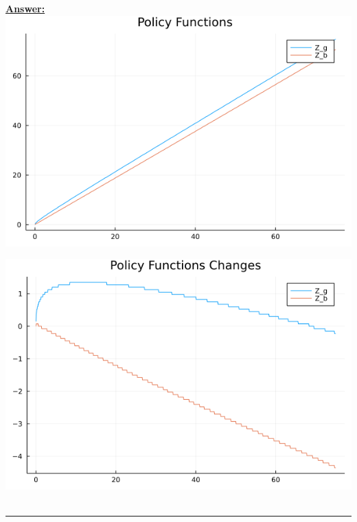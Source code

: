 \documentclass{article} %
\theoremstyle{definition}
\newenvironment{solution}[1][Answer]{\begin{singlespace}\underline{\textbf{#1:}}\quad }{\ \rule{0.3em}{0.3em}\end{singlespace}} %
\begin{document}
\begin{enumerate}
\begin{solution}
		\includegraphics[width=\linewidth]{02_Policy_Functions.png}
		
		\includegraphics[width=\linewidth]{02_Policy_Functions_Changes.png}
	\end{solution}
\end{enumerate}
\end{document}
